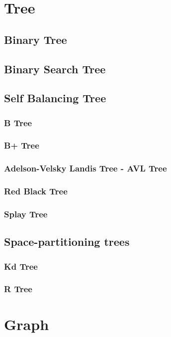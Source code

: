 \chapter{Tree}

\section{Binary Tree}
\section{Binary Search Tree}

\section{Self Balancing Tree}
\subsection{B Tree}
\subsection{B+ Tree}

\subsection{Adelson-Velsky Landis Tree - AVL Tree}
\subsection{Red Black Tree}
\subsection{Splay Tree}


\section{Space-partitioning trees}
\subsection{Kd Tree}
\subsection{R Tree}

\chapter{Graph}


